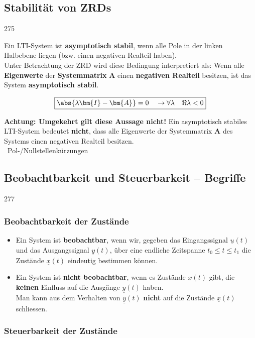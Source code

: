 \subsection{Stabilität von ZRDs}{275}

Ein LTI-System ist \textbf{asymptotisch stabil}, wenn alle Pole in der linken Halbebene liegen (bzw. einen negativen Realteil haben). \\
Unter Betrachtung der ZRD wird diese Bedingung interpretiert als:
Wenn alle \textbf{Eigenwerte} der \textbf{Systemmatrix} $\bm{A}$ einen \textbf{negativen Realteil} besitzen, ist das System 
\textbf{asymptotisch stabil}.

$$ \boxed{ \abs{\lambda \bm{I} - \bm{A}}  = 0 \quad \rightarrow \forall \lambda \quad \Re{\lambda} < 0 }  $$

\textbf{Achtung: Umgekehrt gilt diese Aussage nicht!} Ein asymptotisch stabiles LTI-System bedeutet \textbf{nicht}, 
dass alle Eigenwerte der Systemmatrix $\bm{A}$ des Systems einen negativen Realteil besitzen. \\
\textrightarrow\ Pol-/Nullstellenkürzungen


\subsection{Beobachtbarkeit und Steuerbarkeit -- Begriffe}{277}

\subsubsection*{Beobachtbarkeit der Zustände}

\begin{itemize}
    \item Ein System ist \textbf{beobachtbar}, wenn wir, gegeben das Eingangssignal $\underline{u}(t)$ und das Ausgangssignal $\underline{y}(t)$,
        über eine endliche Zeitspanne $t_0 \leq t \leq t_1$ die Zustände $\underline{x}(t)$ eindeutig bestimmen können. 
    \item Ein System ist \textbf{nicht beobachtbar}, wenn es Zustände $\underline{x}(t)$ gibt, die \textbf{keinen} Einfluss
        auf die Ausgänge $\underline{y}(t)$ haben. \\   
        \textrightarrow Man kann aus dem Verhalten von $\underline{y}(t)$ \textbf{nicht} auf die Zustände $\underline{x}(t)$ schliessen.
\end{itemize}


\subsubsection*{Steuerbarkeit der Zustände}

